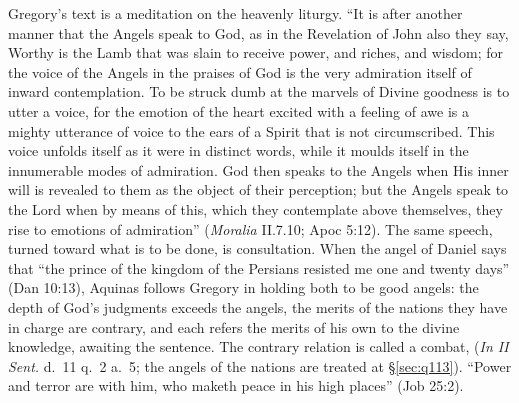Gregory's text is a meditation on the heavenly liturgy. ``It is after another
manner that the Angels speak to God, as in the Revelation of John also they
say, Worthy is the Lamb that was slain to receive power, and riches, and
wisdom; for the voice of the Angels in the praises of God is the very
admiration itself of inward contemplation. To be struck dumb at the marvels
of Divine goodness is to utter a voice, for the emotion of the heart excited
with a feeling of awe is a mighty utterance of voice to the ears of a Spirit
that is not circumscribed. This voice unfolds itself as it were in distinct
words, while it moulds itself in the innumerable modes of admiration. God
then speaks to the Angels when His inner will is revealed to them as the
object of their perception; but the Angels speak to the Lord when by means of
this, which they contemplate above themselves, they rise to emotions of
admiration'' (\emph{Moralia} II.7.10; Apoc 5:12). The same speech, turned
toward what is to be done, is consultation. When the angel of Daniel says
that ``the prince of the kingdom of the Persians resisted me one and twenty
days'' (Dan 10:13), Aquinas follows Gregory in holding both to be good
angels: the depth of God's judgments exceeds the angels, the merits of the
nations they have in charge are contrary, and each refers the merits of his
own to the divine knowledge, awaiting the sentence. The contrary relation is
called a combat,  (\emph{In II Sent.} d.~11
q.~2 a.~5; the angels of the nations are treated at \S\ref{sec:q113}).
``Power and terror are with him, who maketh peace in his high places'' (Job
25:2).

